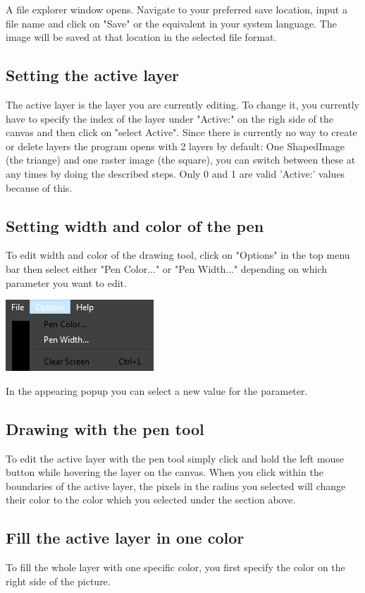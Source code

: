 \documentclass[a4paper, 12pt]{article}
\begin{document}
A file explorer window opens. Navigate to your preferred save location, input a file name and click on "Save" or the equivalent in your system language. The image will be saved at that location in the selected file format.

\subsection{Setting the active layer}
The active layer is the layer you are currently editing. To change it, you currently have to specify the index of the layer under "Active:" on the righ side of the canvas and then click on "select Active". Since there is currently no way to create or delete layers the program opens with 2 layers by default: One ShapedImage (the triange) and one raster image (the square), you can switch between these at any times by doing the described steps.
Only 0 and 1 are valid 'Active:' values because of this.

\subsection{Setting width and color of the pen}
To edit width and color of the drawing tool, click on "Options" in the top menu bar then select either "Pen Color..." or "Pen Width..." depending on which parameter you want to edit.
\begin{center}
\includegraphics[width=0.3\linewidth,keepaspectratio]{assets/file-options}
\end{center}
In the appearing popup you can select a new value for the parameter.

\subsection{Drawing with the pen tool}
To edit the active layer with the pen tool simply click and hold the left mouse button while hovering the layer on the canvas. When you click within the boundaries of the active layer, the pixels in the radius you selected will change their color to the color which you selected under the section above.

\subsection{Fill the active layer in one color}
To fill the whole layer with one specific color, you first specify the color on the right side of the picture.
\end{document}
